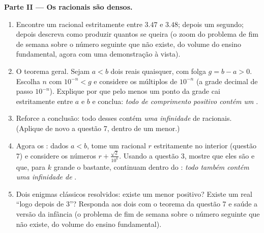 \begin{problem}
\medskip
\noindent\textbf{Parte II --- Os racionais são densos.}
\begin{enumerate}[resume]
  \item Encontre um racional estritamente entre $3.47$ e $3.48$;
        depois um segundo; depois descreva como produzir quantos
        se queira (o zoom do problema de fim de semana sobre o
        número seguinte que não existe, do volume do ensino
        fundamental, agora com uma demonstração à vista).
  \item O teorema geral. Sejam $a < b$ dois reais quaisquer, com
        folga $g = b - a > 0$. Escolha $n$ com
        $10^{-n} < g$ e considere os múltiplos de $10^{-n}$
        (a grade decimal de passo $10^{-n}$). Explique por que
        pelo menos um ponto da grade cai estritamente entre $a$ e
        $b$ e conclua: \emph{todo  de comprimento
        positivo contém um }.
  \item Reforce a conclusão: todo  desses contém
        \emph{uma infinidade} de racionais. (Aplique de novo a
        questão 7, dentro de um  menor.)
  \item Agora os : dados $a < b$, tome um racional $r$
        estritamente no interior (questão 7) e considere os
        números $r + \frac{\sqrt2}{10^k}$. Usando a questão 3,
        mostre que eles são  e que, para $k$ grande o
        bastante, continuam dentro do : \emph{todo
         também contém uma infinidade de }.
  \item Dois enigmas clássicos resolvidos: existe um menor
         positivo? Existe um real ``logo depois de
        $3$''? Responda aos dois com o teorema da questão 7 e
        saúde a versão da infância (o problema de fim de semana
        sobre o número seguinte que não existe, do volume do
        ensino fundamental).
\end{enumerate}


\end{problem}
